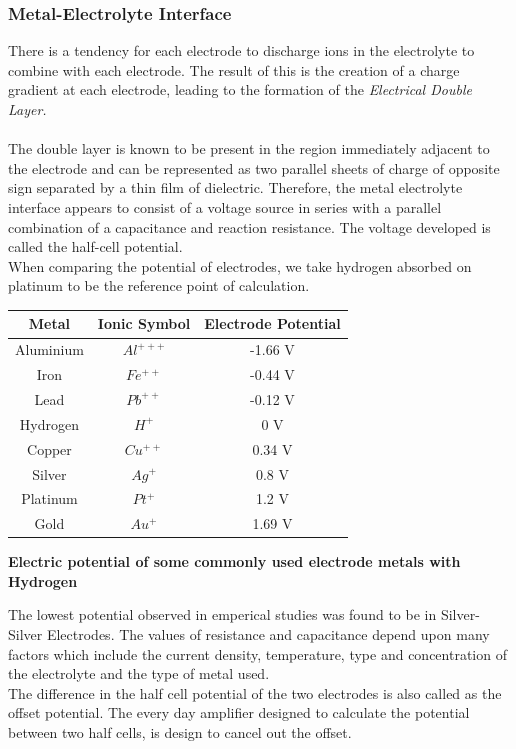 \documentclass{article}
\begin{document}
\subsubsection{Metal-Electrolyte Interface}
There is a tendency for each electrode to discharge ions in the electrolyte to combine with each electrode. The result of this is the creation of a charge gradient at each electrode, leading to the formation of the \textit{Electrical Double Layer.}\\
\\
The double layer is known to be present in the region immediately adjacent to the electrode and can be represented as two parallel sheets of charge of opposite sign separated by a thin film of dielectric. Therefore, the metal electrolyte interface appears to consist of a voltage source in series with a parallel combination of a capacitance and reaction resistance. The voltage developed is called the half-cell potential.\\When comparing the potential of electrodes, we take hydrogen absorbed on platinum to be the reference point of calculation.\newpage
\begin{table}
    \centering
    \begin{tabular}{|c|c|c|}
    \hline
        Metal & Ionic Symbol & Electrode Potential  \\
        \hline
        Aluminium & $Al^{+++}$ & -1.66 V \\
        Iron & $Fe^{++}$ & -0.44 V \\
        Lead & $Pb^{++}$ & -0.12 V \\
        Hydrogen & $H^{+}$ & 0 V \\
        Copper & $Cu^{++}$ & 0.34 V \\
        Silver & $Ag^{+}$ & 0.8 V \\
        Platinum & $Pt^{+}$ & 1.2 V \\
        Gold & $Au^{+}$ & 1.69 V \\
        \hline
    \end{tabular}
   \begin{center}
       \textbf{Electric potential of some commonly used electrode metals with Hydrogen}
   \end{center} 
    \label{tab:my_label}
\end{table}
The lowest potential observed in emperical studies was found to be in Silver-Silver Electrodes. The values of resistance and capacitance depend upon many factors which include the current density, temperature, type and concentration of the electrolyte and the type of metal used.\\The difference in the half cell potential of the two electrodes is also called as the offset potential. The every day amplifier designed to calculate the potential between two half cells, is design to cancel out the offset.
\end{document}
